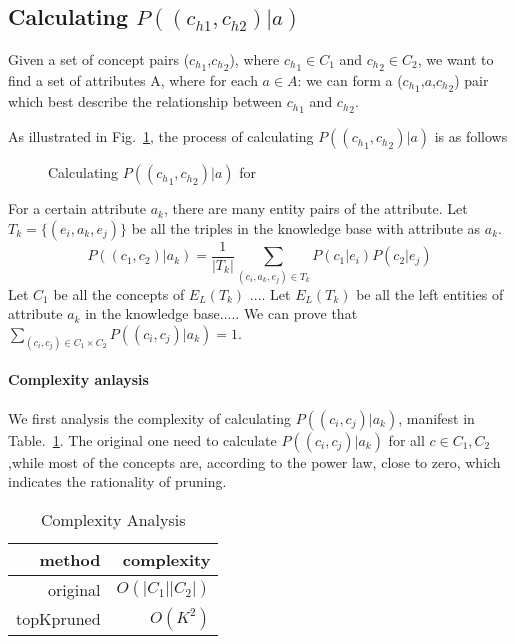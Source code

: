\subsection{Calculating $P((c_{h1},c_{h2})|a)$ }


Given a set of concept pairs (${c_h}_1$,${c_h}_2$), where ${c_h}_1\in C_1$ and ${c_h}_2\in C_2$, we want to find a set of attributes A, where for each $a \in A$:
we can form a (${c_h}_1$,$a$,${c_h}_2$) pair which best describe the relationship between ${c_h}_1$ and ${c_h}_2$.

\begin{example}[Calculating $P(({c_h}_{1},{c_h}_{2}) |a)$]
\label{exa:pggga}
As illustrated in Fig.~\ref{fig:bipartite}, the process of calculating $P(({c_h}_{1},{c_h}_{2}) |a)$ is as follows\term{}
\end{example}


\begin{figure}[!htb]
\centering {}
\caption{Calculating $P(({c_h}_{1},{c_h}_{2}) |a) $ for } \label{fig:bipartite}
\end{figure}


For a certain attribute $a_k$, there are many entity pairs of the attribute.
Let $T_k=\{(e_i, a_k, e_j)\}$ be all the triples in the knowledge base with attribute as $a_k$.
\begin{equation}
 P((c_1, c_2) |a_k) = \frac{1}{|T_k|}\sum_{  (e_{i},a_k,e_{j})\in T_k } P(c_1|e_{i})P(c_2|e_{j})
 \end{equation}
Let $C_1$ be all the concepts of $E_L(T_k)$ .... Let $E_L(T_k)$ be all the left entities of attribute $a_k$ in the knowledge base..... We can prove that $\sum_{(c_i,c_j)\in C_1\times C_2} P((c_i, c_j)|a_k)=1$.

\paragraph{Complexity anlaysis}

We first analysis the complexity of calculating $P((c_i, c_j)|a_k)$, manifest in Table.~\ref{tab:complexity}. The original one need to calculate $P((c_i, c_j)|a_k)$ for all $c \in C_1,C_2 $,while most of the concepts are, according to the power law, close to zero, which indicates the rationality of pruning.

\begin{table}[htbp]
  \centering
  \caption{Complexity Analysis}
    \begin{tabular}{rr}
    \toprule
    method & complexity \\
    \midrule
    original &  $O(|C_1||C_2|)$ \\
    topKpruned & $O(K^2)$ \\
    \bottomrule
    \end{tabular}%
  \label{tab:complexity}%
\end{table}%



